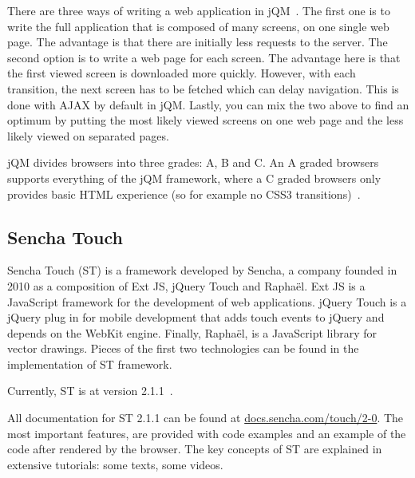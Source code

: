 \documentclass[a4paper]{artikel3}
\renewcommand{\url}[1]{\href{http://#1}{#1}}
\renewcommand{\paragraph}[1]{\vspace{2mm} \noindent {\bf #1}  }
\begin{document}
There are three ways of writing a web application in jQM~\cite{Broulik2012}. 
The first one is to write the full application that is composed of many screens, on one single web page.
The advantage is that there are initially less requests to the server.
The second option is to write a web page for each screen. 
The advantage here is that the first viewed screen is downloaded more quickly. 
However, with each transition, the next screen has to be fetched which can delay navigation.
This is done with AJAX by default in jQM.
Lastly, you can mix the two above to find an optimum by putting the most likely viewed screens on one web page and the less likely viewed on separated pages.  

\paragraph{Browser support}
\label{sec:jqm-browser-support}
jQM divides browsers into three grades: A, B and C. 
An A graded browsers supports everything of the jQM framework, where a C graded browsers only provides basic HTML experience (so for example no CSS3 transitions)~\cite{JQuery2012d}.

\subsection{Sencha Touch} %
\label{sec:sencha_touch}

Sencha Touch	 (ST) is a framework developed by Sencha,  a company founded in 2010 as a composition of Ext JS, jQuery Touch and Raphaël.  Ext JS is a JavaScript framework for the development of web applications.  jQuery Touch is a jQuery plug in for mobile development that adds touch events to jQuery and depends on the WebKit engine.  Finally,  Raphaël, is a JavaScript library for vector drawings.  Pieces of the first two technologies can be found in the implementation of ST framework.    

Currently,  ST is at version 2.1.1~\cite{Inc.}.

\paragraph{Documentation}
All documentation for ST 2.1.1 can be found at \url{docs.sencha.com/touch/2-0}.  The most important features,  are provided with code examples and an example of the code after rendered by the browser.  The key concepts of ST are explained in extensive tutorials:  some texts, some videos.  
\end{document}
